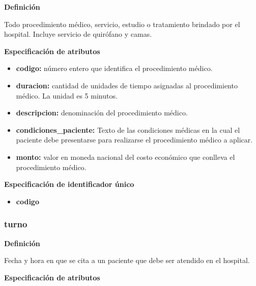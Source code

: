 \documentclass[a4paper,11pt]{article}
\begin{document}
\textbf{Definición}

Todo procedimiento médico, servicio, estudio o tratamiento brindado por el hospital. 
Incluye servicio de quirófano y camas.

\textbf{Especificación de atributos}

\begin{itemize}

     \item \textbf{codigo:} número entero que identifica el procedimiento médico.

     \item \textbf{duracion:} cantidad de unidades de tiempo asignadas al procedimiento médico. La 
     unidad es 5 minutos.

     \item \textbf{descripcion:} denominación del procedimiento médico.

     \item \textbf{condiciones\_paciente:} Texto de las condiciones médicas en la cual el paciente 
     debe presentarse para realizarse el procedimiento médico a aplicar.

     \item \textbf{monto:} valor en moneda nacional del costo económico que conlleva el procedimiento médico.

\end{itemize}

\textbf{Especificación de identificador único}

\begin{itemize}

     \item \textbf{codigo}

\end{itemize}

\subsubsection{\textbf{turno}}

\textbf{Definición}

Fecha y hora en que se cita a un paciente que debe ser atendido en el hospital.

\textbf{Especificación de atributos}
\end{document}
